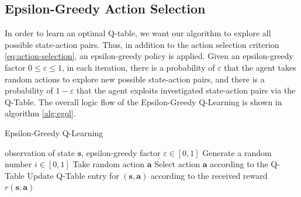 \documentclass[10pt,a4paper]{article}
\begin{document}
\subsection{Epsilon-Greedy Action Selection}
In order to learn an optimal Q-table, we want our algorithm to explore all possible state-action pairs. Thus, in addition to the action selection criterion \eqref{eq:action-selection},  an epsilon-greedy policy is applied. Given an epsilon-greedy factor $0 \le \varepsilon \le 1$, in each iteration, there is a probability of $\varepsilon$ that the agent takes random actions to explore new possible state-action pairs, and there is a probability of $1 - \varepsilon$ that the agent exploits investigated state-action pairs via the Q-Table. The overall logic flow of the Epsilon-Greedy Q-Learning is shown in algorithm \ref{alg:egql}. 

\begin{algorithm}
\caption{Epsilon-Greedy Q-Learning}\label{alg:egql}
\begin{algorithmic}
\Require observation of state $\boldsymbol{s}$, epsilon-greedy factor $\varepsilon \in [0,1]$
\State Generate a random number $i \in [0,1]$
\State Take random action $\boldsymbol{a}$
\Else
\State Select action $\boldsymbol{a}$ according to the Q-Table 
\EndIf
\State Update Q-Table entry for $(\boldsymbol{s}, \boldsymbol{a})$ according to the received reward $r(\boldsymbol{s}, \boldsymbol{a})$ 
\EndWhile
\end{algorithmic}
\end{algorithm}
\end{document}

